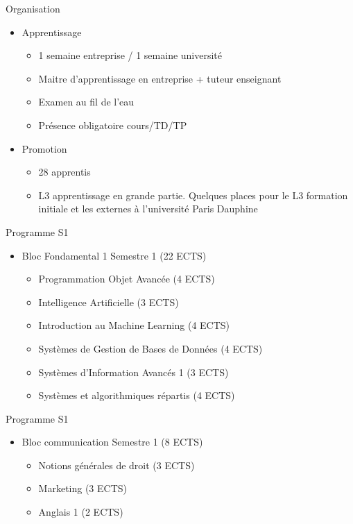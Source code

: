 \documentclass[minimal,compress]{beamer}
\begin{document}
\begin{frame}{Organisation}
\begin{itemize}
\item Apprentissage
\begin{itemize}
\item 1 semaine entreprise / 1 semaine université
\item 	Maitre d’apprentissage en entreprise + tuteur enseignant
\item 	Examen au fil de l’eau
\item 	Présence obligatoire cours/TD/TP

\end{itemize}
\item Promotion
\begin{itemize}
\item 28 apprentis
\item L3 apprentissage  en grande partie. Quelques places pour le L3 formation initiale et les externes à l’université Paris Dauphine
\end{itemize}
\end{itemize}
\end{frame}



\begin{frame}{Programme S1}
\begin{itemize}
\item \alert{Bloc Fondamental 1} Semestre 1 (22 ECTS)
\begin{itemize}
\item Programmation Objet Avancée (4 ECTS)
\item Intelligence Artificielle (3 ECTS)
\item Introduction au Machine Learning (4 ECTS)
\item Systèmes de Gestion de Bases de Données  (4 ECTS)
\item Systèmes d’Information Avancés 1 (3 ECTS)
\item Systèmes et algorithmiques répartis (4 ECTS)
\end{itemize}
\end{itemize}
\end{frame}

\begin{frame}{Programme S1}
\begin{itemize}
\item \alert{Bloc communication} Semestre 1 (8 ECTS)
\begin{itemize}
\item Notions générales de droit (3 ECTS)
\item Marketing (3 ECTS)	
\item Anglais 1 (2 ECTS)
\end{itemize}
\end{itemize}
\end{frame}
\end{document}
